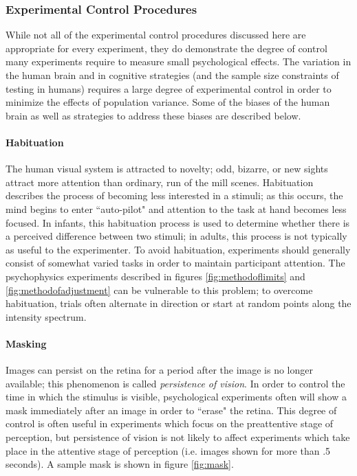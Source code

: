 \documentclass[11pt]{isuthesis}\usepackage[]{graphicx}\usepackage[]{color}
\begin{document}
\subsubsection{Experimental Control Procedures}
While not all of the experimental control procedures discussed here are appropriate for every experiment, they do demonstrate the degree of control many experiments require to measure small psychological effects. The variation in the human brain and in cognitive strategies (and the sample size constraints of testing in humans) requires a large degree of experimental control in order to minimize the effects of population variance. Some of the biases of the human brain as well as strategies to address these biases are described below.

\paragraph{Habituation} The human visual system is attracted to novelty; odd, bizarre, or new sights attract more attention than ordinary, run of the mill scenes. Habituation describes the process of becoming less interested in a stimuli; as this occurs, the mind begins to enter ``auto-pilot" and attention to the task at hand becomes less focused. In infants, this habituation process is used to determine whether there is a perceived difference between two stimuli; in adults, this process is not typically as useful to the experimenter. To avoid habituation, experiments should generally consist of somewhat varied tasks in order to maintain participant attention. The psychophysics experiments described in figures \ref{fig:methodoflimits} and \ref{fig:methodofadjustment} can be vulnerable to this problem; to overcome habituation, trials often alternate in direction or start at random points along the intensity spectrum. 

\paragraph{Masking} Images can persist on the retina for a period after the image is no longer available; this phenomenon is called \emph{persistence of vision}. In order to control the time in which the stimulus is visible, psychological experiments often will show a mask immediately after an image in order to ``erase" the retina. This degree of control is often useful in experiments which focus on the preattentive stage of perception, but persistence of vision is not likely to affect experiments which take place in the attentive stage of perception (i.e. images shown for more than .5 seconds). A sample mask is shown in figure \ref{fig:mask}. 
\end{document}
